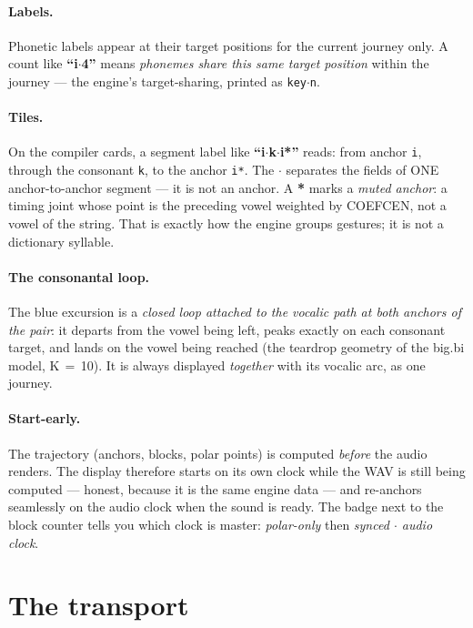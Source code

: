 \documentclass[11pt,a4paper]{article}
\begin{document}
\paragraph{Labels.} Phonetic labels appear at their target positions
for the current journey only. A count like \textbf{``i$\cdot$4''} means
\emph{phonemes share this same target position} within the journey ---
the engine's target-sharing, printed as \texttt{key$\cdot$n}.

\paragraph{Tiles.} On the compiler cards, a segment label like
\textbf{``i$\cdot$k$\cdot$i*''} reads: from anchor \texttt{i}, through the
consonant \texttt{k}, to the anchor \texttt{i*}. The \textbf{$\cdot$}
separates the fields of ONE anchor-to-anchor segment --- it is not an
anchor. A \textbf{*} marks a \emph{muted anchor}: a timing joint whose
point is the preceding vowel weighted by COEFCEN, not a vowel of the
string. That is exactly how the engine groups gestures; it is not a
dictionary syllable.

\paragraph{The consonantal loop.} The blue excursion is a \emph{closed
loop attached to the vocalic path at both anchors of the pair}: it
departs from the vowel being left, peaks exactly on each consonant
target, and lands on the vowel being reached (the teardrop geometry of
the big.bi model, K\,$=$\,10). It is always displayed \emph{together}
with its vocalic arc, as one journey.

\paragraph{Start-early.} The trajectory (anchors, blocks, polar points)
is computed \emph{before} the audio renders. The display therefore starts
on its own clock while the WAV is still being computed --- honest, because
it is the same engine data --- and re-anchors seamlessly on the audio
clock when the sound is ready. The badge next to the block counter tells
you which clock is master: \emph{polar-only} then \emph{synced $\cdot$
audio clock}.

\section{The transport}
\end{document}
